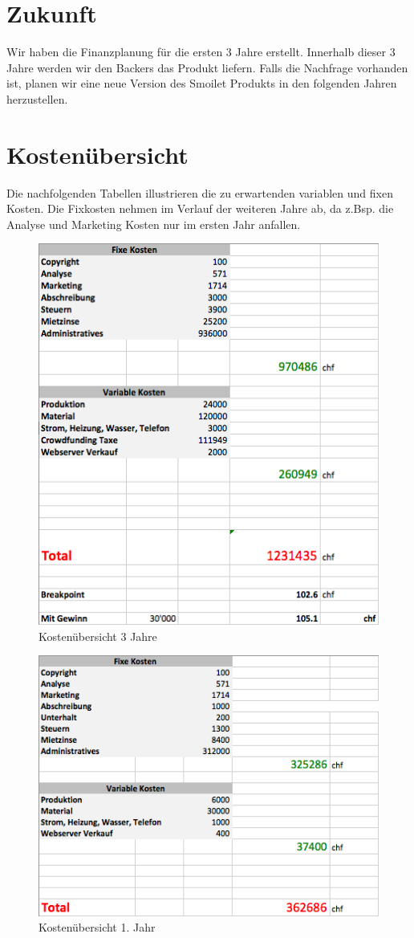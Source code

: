 \section{Zukunft}
Wir haben die Finanzplanung f\"ur die ersten 3 Jahre erstellt. Innerhalb dieser 3 Jahre werden wir den Backers das Produkt liefern. Falls die Nachfrage vorhanden ist, planen wir eine neue Version des Smoilet Produkts in den folgenden Jahren herzustellen. 
\section{Kosten\"ubersicht}
Die nachfolgenden Tabellen illustrieren die zu erwartenden variablen und fixen Kosten. Die Fixkosten nehmen im Verlauf der weiteren Jahre ab, da z.Bsp. die Analyse und Marketing Kosten nur im ersten Jahr anfallen.
\begin{figure}[H]
	\centering
		\includegraphics[scale=0.6]{bilder/3Jahre.png}
	\caption{Kosten\"ubersicht 3 Jahre}
	\label{fig:3Jahre}
\end{figure}
\begin{figure}[H]
	\centering
		\includegraphics[scale=0.6]{bilder/Jahr1.png}
	\caption{Kosten\"ubersicht 1. Jahr}
	\label{fig:Jahr1}
\end{figure}

